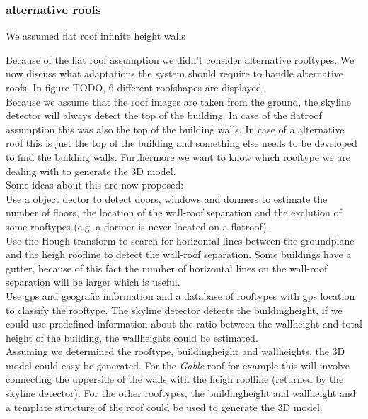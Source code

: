 \documentclass[10pt]{article}
\begin{document}
\subsubsection{alternative roofs}

We assumed flat roof
infinite height walls

Because of the flat roof assumption we didn't consider alternative rooftypes.
We now discuss what adaptations the system should require to handle alternative roofs.
In figure TODO, 6 different roofshapes are displayed.\\
Because we assume that the roof images are taken from the ground, the skyline
detector will always detect the top of the building. In case of the flatroof
assumption this was also the top of the building walls.
In case of a alternative roof this is just the top of the building and something
else needs to be developed to find the building walls. Furthermore we want to
know which rooftype we are dealing with to generate the 3D model.\\
Some ideas about this are now proposed:\\
Use a object dector to detect doors, windows and dormers to estimate the
number of floors, the location of the wall-roof separation and the exclution of
some rooftypes (e.g. a dormer is never located on a flatroof).\\
Use the Hough transform to search for horizontal lines between the groundplane and the
heigh roofline to detect the wall-roof separation. Some buildings have a gutter,
because of this fact the number of horizontal lines on the wall-roof separation
will be larger which is useful.\\
Use gps and geografic information and a database of rooftypes with gps location
to classify the rooftype. The skyline detector detects the buildingheight, if we
could use predefined information about the ratio between the wallheight and
total height of the building, the wallheights could be estimated.\\
Assuming we determined the rooftype, buildingheight and wallheights, the 3D model could 
easy be generated. 
For the \emph{Gable} roof for example this will involve connecting the upperside of the
walls with the heigh roofline (returned by the skyline detector). For the other
rooftypes, the buildingheight and wallheight and a template structure of the
roof could be used to generate the 3D model.
\end{document}
